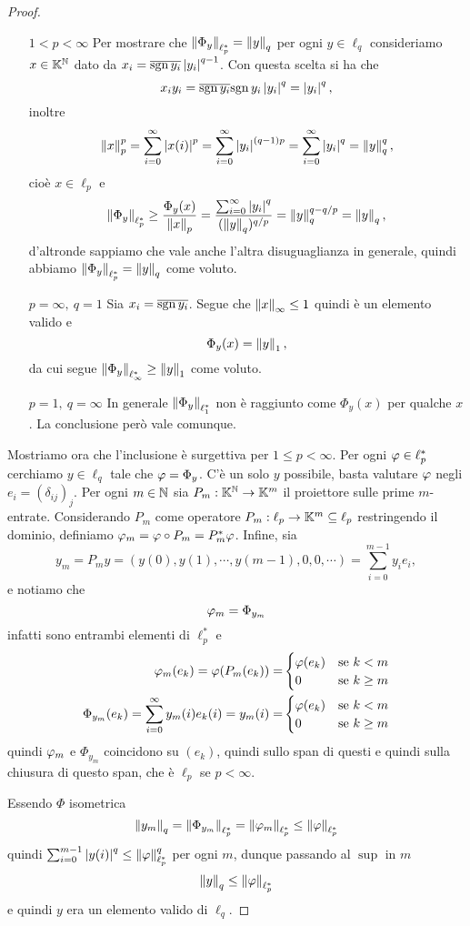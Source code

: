 \begin{proof}
\setlength{\leftmargini}{0cm}
\begin{itemize}
\item[$\boxed{1< p<\infty}$] Per mostrare che $\left\Vert{\Phi_y}\right\Vert_{\ell_p^\ast}=\left\Vert{y}\right\Vert_q$ per ogni $y\in \ell_q$ consideriamo $x\in\mathbb{K}^{\mathbb{N}}$ dato da $x_i=\overline{\operatorname{sgn} y_i}\left|{y_i}\right|^{q-1}$. Con questa scelta si ha che
\[x_iy_i=\overline{\operatorname{sgn} y_i}{\operatorname{sgn} y_i}\left|{y_i}\right|^q=\left|{y_i}\right|^q,\]
inoltre
\[\left\Vert{x}\right\Vert_p^p=\sum_{i=0}^\infty \left|{x(i)}\right|^p=\sum_{i=0}^\infty \left|{y_i}\right|^{(q-1)p}=\sum_{i=0}^\infty \left|{y_i}\right|^{q}=\left\Vert{y}\right\Vert_q^q,\]
cio\`e $x\in \ell_p$ e 
\[\left\Vert{\Phi_y}\right\Vert_{\ell_p^\ast}\geq \frac{\Phi_y(x)}{\left\Vert{x}\right\Vert_p}=\frac{\sum_{i=0}^\infty \left|{y_i}\right|^q}{(\left\Vert{y}\right\Vert_q)^{q/p}}=\left\Vert{y}\right\Vert_q^{q-q/p}=\left\Vert{y}\right\Vert_q,\]
d'altronde sappiamo che vale anche l'altra disuguaglianza in generale, quindi abbiamo $\left\Vert{\Phi_y}\right\Vert_{\ell_p^\ast}=\left\Vert{y}\right\Vert_q$ come voluto.
\item[$\boxed{p=\infty,\ q=1}$] Sia $x_i=\overline{\operatorname{sgn} y_i}$. Segue che $\left\Vert{x}\right\Vert_\infty\leq 1$ quindi \`e un elemento valido e
\[\Phi_y(x)=\left\Vert{y}\right\Vert_1,\]
da cui segue $\left\Vert{\Phi_y}\right\Vert_{\ell_\infty^\ast}\geq \left\Vert{y}\right\Vert_1$ come voluto.
\item[$\boxed{p=1,\ q=\infty}$] In generale $\left\Vert{\Phi_y}\right\Vert_{\ell_1^\ast}$ non \`e raggiunto come $\Phi_y(x)$ per qualche $x$. La conclusione per\`o vale comunque.
\end{itemize}
Mostriamo ora che l'inclusione \`e surgettiva per $1\leq p<\infty$. Per ogni $\varphi\in \ell_p^\ast$ cerchiamo $y\in\ell_q$ tale che $\varphi=\Phi_y$. C'\`e un solo $y$ possibile, basta valutare $\varphi$ negli $e_i=(\delta_{ij})_j$. Per ogni $m\in\mathbb{N}$ sia $P_m:\mathbb{K}^{\mathbb{N}}\to \mathbb{K}^m$ il proiettore sulle prime $m$-entrate. Considerando $P_m$ come operatore $P_m:\ell_p\to\mathbb{K}^m\subseteq \ell_p$ restringendo il dominio, definiamo $\varphi_m=\varphi\circ P_m=P_m^\ast\varphi$. Infine, sia 
\[y_m=P_m y=(y(0),y(1),\cdots, y(m-1), 0,0,\cdots)=\sum_{i=0}^{m-1}y_ie_i,\] 
e notiamo che
\[\varphi_m=\Phi_{y_m}\]
infatti sono entrambi elementi di $\ell_p^\ast$ e 
\begin{align*}
    \varphi_m(e_k)=\varphi(P_m(e_k))=&\begin{cases}
        \varphi(e_k) &\text{se }k<m\\
        0 &\text{se }k\geq m
        \end{cases}\\
    \Phi_{y_m}(e_k)=\sum_{i=0}^\infty y_m(i)e_k(i)=y_m(i)=&\begin{cases}
        \varphi(e_k) &\text{se }k<m\\
        0 &\text{se }k\geq m
        \end{cases}
\end{align*}
quindi $\varphi_m$ e $\Phi_{y_m}$ coincidono su $(e_k)$, quindi sullo span di questi e quindi sulla chiusura di questo span, che \`e $\ell_p$ se $p<\infty$.

Essendo $\Phi$ isometrica
\[\left\Vert{y_m}\right\Vert_q=\left\Vert{\Phi_{y_m}}\right\Vert_{\ell_p^\ast}=\left\Vert{\varphi_m}\right\Vert_{\ell_p^\ast}\leq \left\Vert{\varphi}\right\Vert_{\ell_p^\ast}\]
quindi $\sum_{i=0}^{m-1}\left|{y(i)}\right|^q\leq \left\Vert{\varphi}\right\Vert_{\ell_p^\ast}^q$ per ogni $m$, dunque passando al $\sup$ in $m$ 
\[\left\Vert{y}\right\Vert_q\leq \left\Vert{\varphi}\right\Vert_{\ell_p^\ast}\]
e quindi $y$ era un elemento valido di $\ell_q$.
\setlength{\leftmargini}{0.5cm}
\end{proof}

